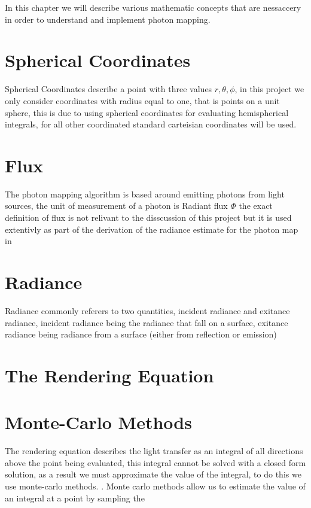 In this chapter we will describe various mathematic concepts that are nessaccery in order to understand and implement photon mapping.

\section{Spherical Coordinates}
Spherical Coordinates describe a point with three values $r, \theta, \phi$, in this project we only consider coordinates with
radius equal to one, that is points on a unit sphere, this is due to using spherical coordinates for evaluating hemispherical
integrals, for all other coordinated standard carteisian coordinates will be used.


\section{Flux}
The photon mapping algorithm is based around emitting photons from light sources, the unit of measurement of a photon is
Radiant flux $\Phi$ the exact definition of flux is not relivant to the disscussion of this project but it is used extentivly
as part of the derivation of the radiance estimate for the photon map in 

\section{Radiance}
Radiance commonly referers to two quantities, incident radiance and exitance radiance, incident radiance being the radiance
that fall on a surface, exitance radiance being radiance from a surface (either from reflection or emission)

\section{The Rendering Equation}

\section{Monte-Carlo Methods}
The rendering equation describes the light transfer as an integral of all directions above the point being evaluated, this
integral cannot be solved with a closed form solution, as a result we must approximate the value of the integral, to do this
we use monte-carlo methods. . Monte carlo methods allow us to estimate the value of an integral at a point
by sampling the 

